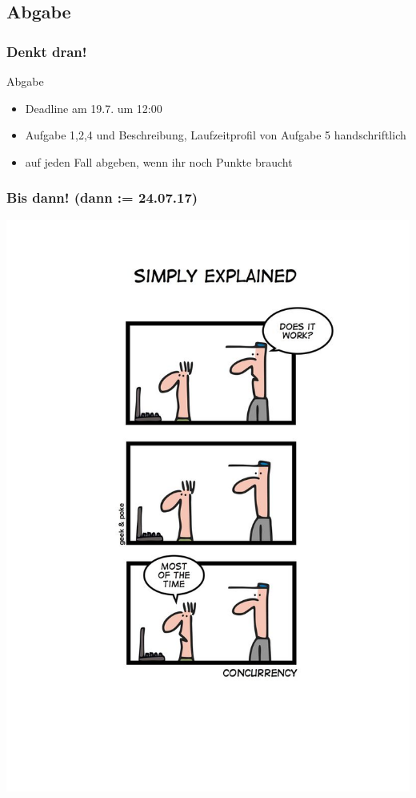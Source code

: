 \documentclass[18pt]{beamer}
\begin{document}
	\subsection{Abgabe}
	\begin{frame}
		\frametitle{Denkt dran!}
		\begin{alertblock}{Abgabe}
			\begin{itemize}
				\item Deadline am 19.7. um 12:00
				\item Aufgabe 1,2,4 und Beschreibung, Laufzeitprofil von Aufgabe 5 handschriftlich
				\item auf jeden Fall abgeben, wenn ihr noch Punkte braucht
			\end{itemize}
		\end{alertblock}
	\end{frame}

	\begin{frame}
		\frametitle{Bis dann! (dann  := 24.07.17)}
		\centering
		\includegraphics[scale=1.0]{./comics/geek_and_poke_concurrency.jpg}
	\end{frame}
\end{document}
